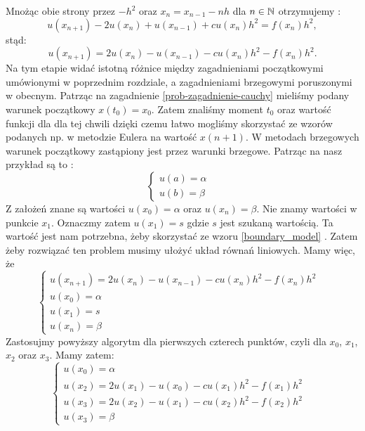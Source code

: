 \documentclass[12pt,a4paper]{report}
\begin{document}
Mnożąc obie strony przez $-h^2$ oraz $x_n = x_{n-1} - nh$ dla $n \in \mathbb{N}$  otrzymujemy :
\begin{equation}
u(x_{n+1}) - 2u(x_n) + u(x_{n-1}) + cu(x_n)h^2 = f(x_n)h^2,
\end{equation}
stąd:
\begin{equation} \label{boundary_model}
u(x_{n+1}) = 2u(x_n) - u(x_{n-1}) - cu(x_n)h^2 - f(x_n)h^2.
\end{equation}
Na tym etapie widać istotną różnice między zagadnieniami początkowymi umówionymi w poprzednim rozdziale, a zagadnieniami brzegowymi poruszonymi w obecnym. Patrząc na zagadnienie \ref{prob-zagadnienie-cauchy} mieliśmy podany warunek początkowy $x(t_0) = x_0$. Zatem znaliśmy moment $t_0$ oraz wartość funkcji dla dla tej chwili dzięki czemu łatwo mogliśmy skorzystać ze wzorów podanych np. w metodzie Eulera na wartość $x(n+1)$. W metodach brzegowych warunek początkowy zastąpiony jest przez warunki brzegowe. Patrząc na nasz przykład są to :
$$
\left\{ \begin{array}{ll}
u(a) = \alpha & \\
u(b) = \beta & 
\end{array} \right.
$$
Z założeń znane są wartości $u(x_0) = \alpha $ oraz $u(x_n) = \beta $. Nie znamy wartości w punkcie $x_1$. Oznaczmy zatem $u(x_1) = s$ gdzie $s$ jest szukaną wartością. Ta wartość jest nam potrzebna, żeby skorzystać ze wzoru \ref{boundary_model} . Zatem żeby rozwiązać ten problem musimy ułożyć układ równań liniowych. Mamy więc, że 
\begin{equation}
\left\{ \begin{array}{ll}
u(x_{n+1}) = 2u(x_n) - u(x_{n-1}) - cu(x_n)h^2 - f(x_n)h^2 & \\
u(x_0) = \alpha & \\
u(x_1) = s & \\
u(x_n) = \beta & 
\end{array} \right.
\end{equation}
Zastosujmy powyższy algorytm dla pierwszych czterech punktów, czyli dla $x_0$, $x_1$, $x_2$ oraz $x_3$. Mamy zatem:
\begin{equation}
\left\{ \begin{array}{ll}
u(x_0) = \alpha & \\
u(x_2) = 2u(x_1) - u(x_{0}) - cu(x_1)h^2 - f(x_1)h^2 & \\ 
u(x_3) = 2u(x_2) - u(x_{1}) - cu(x_2)h^2 - f(x_2)h^2 & \\
u(x_3) = \beta & 
\end{array} \right.
\end{equation}
\end{document}
